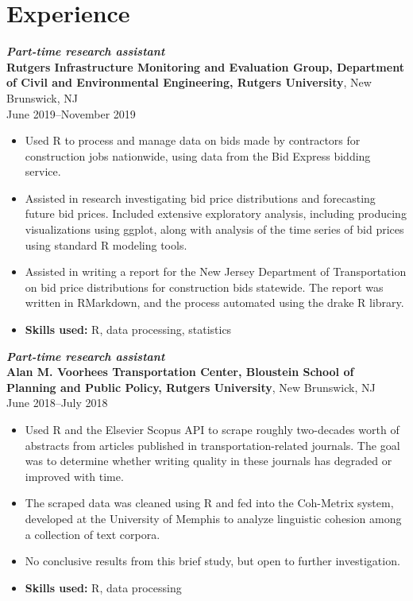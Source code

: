 \documentclass[letterpaper,12pt]{article}
\begin{document}
\section*{Experience}

\textit{\textbf{Part-time research assistant}} \\
\textbf{Rutgers Infrastructure Monitoring and Evaluation Group,
  Department of Civil and Environmental Engineering, Rutgers
  University},
New Brunswick, NJ \\
June 2019--November 2019
\begin{itemize}
\item Used R to process and manage data on bids made by contractors
  for construction jobs nationwide, using data from the Bid Express
  bidding service.
\item Assisted in research investigating bid price distributions and
  forecasting future bid prices. Included extensive exploratory
  analysis, including producing visualizations using ggplot, along
  with analysis of the time series of bid prices using standard R
  modeling tools.
\item Assisted in writing a report for the New Jersey Department of
  Transportation on bid price distributions for construction bids
  statewide. The report was written in RMarkdown, and the process
  automated using the drake R library.
\item \textbf{Skills used:} R, data processing, statistics
\end{itemize}

\textit{\textbf{Part-time research assistant}} \\
\textbf{Alan M. Voorhees Transportation Center, Bloustein School of
  Planning and Public Policy, Rutgers University},
New Brunswick, NJ \\
June 2018--July 2018
\begin{itemize}
\item Used R and the Elsevier Scopus API to scrape roughly two-decades
  worth of abstracts from articles published in transportation-related
  journals. The goal was to determine whether writing quality in these
  journals has degraded or improved with time.
\item The scraped data was cleaned using R and fed into the Coh-Metrix
  system, developed at the University of Memphis to analyze linguistic
  cohesion among a collection of text corpora.
\item No conclusive results from this brief study, but open to further
  investigation.
\item \textbf{Skills used:} R, data processing
\end{itemize}
\end{document}
